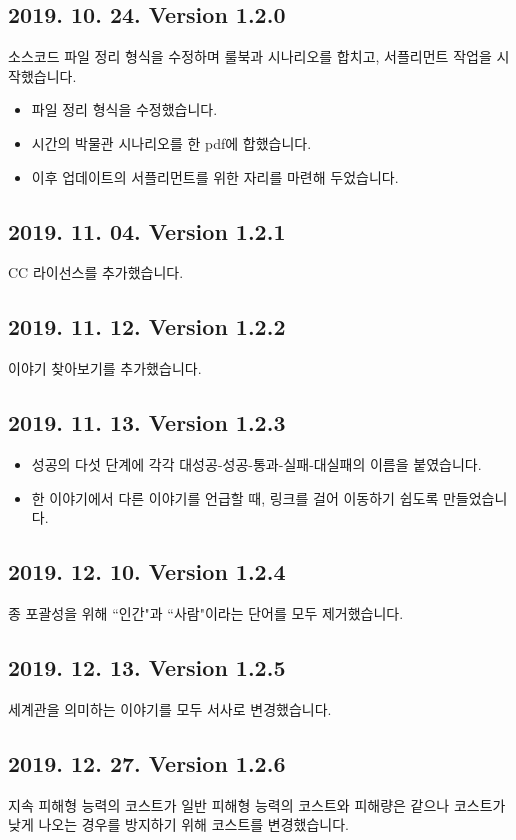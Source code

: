 \documentclass{report}
\begin{document}
	\subsection*{2019. 10. 24. Version 1.2.0}
	소스코드 파일 정리 형식을 수정하며 룰북과 시나리오를 합치고, 서플리먼트 작업을 시작했습니다.

	\begin{itemize}
		\item 파일 정리 형식을 수정했습니다.
		\item 시간의 박물관 시나리오를 한 pdf에 합했습니다.
		\item 이후 업데이트의 서플리먼트를 위한 자리를 마련해 두었습니다.
	\end{itemize}
	
	\subsection*{2019. 11. 04. Version 1.2.1}
	CC 라이선스를 추가했습니다.
	
	\subsection*{2019. 11. 12. Version 1.2.2}
	이야기 찾아보기를 추가했습니다.
	
	\subsection*{2019. 11. 13. Version 1.2.3}
	\begin{itemize}
		\item 성공의 다섯 단계에 각각 대성공-성공-통과-실패-대실패의 이름을 붙였습니다.
		\item 한 이야기에서 다른 이야기를 언급할 때, 링크를 걸어 이동하기 쉽도록 만들었습니다.
	\end{itemize}
	
	\subsection*{2019. 12. 10. Version 1.2.4}
	종 포괄성을 위해 ``인간"과 ``사람"이라는 단어를 모두 제거했습니다.
	
	\subsection*{2019. 12. 13. Version 1.2.5}
	세계관을 의미하는 이야기를 모두 서사로 변경했습니다.
	
	\subsection*{2019. 12. 27. Version 1.2.6}
	지속 피해형 능력의 코스트가 일반 피해형 능력의 코스트와 피해량은 같으나 코스트가 낮게 나오는 경우를 방지하기 위해 코스트를 변경했습니다.
\end{document}
